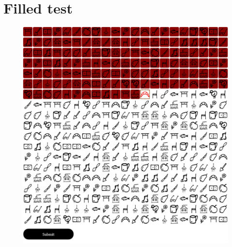 \documentclass[12pt,a4paper]{article}
\begin{document}

\textblockorigin{-18pt}{-2pt}

\newpage
\section*{Filled test}


\begin{figure}[!h]
    \centering
    \includegraphics[scale=0.4]{kitoltott.png}
\end{figure}
\end{document}
